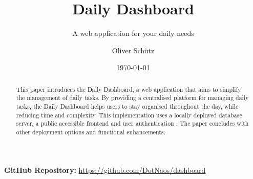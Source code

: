 

\titlehead{BSc Computational and Data Science\\Course: Computer Science (cds-205)\\Instructor: Ana Petrus\hfill}
\title{Daily Dashboard}
\subtitle{A web application for your daily needs}
\author[1,*]{Oliver Schütz}
\date{\today}
\maketitle

\begin{abstract}
    This paper intruduces the Daily Dashboard, a web application that aims to simplify the management of daily tasks.
    By providing a centralised platform for managing daily tasks, the Daily Dashboard helps users to stay organised throughout the day, while reducing time and complexity.
    This implementation uses a locally deployed database server, a public accessible frontend and user authentication . The paper concludes with other deployment options and functional enhancements.
\end{abstract}

\vfill
\begin{center}
    \textbf{GitHub Repository:} \url{https://github.com/DotNaos/dashboard}
\end{center}
\vfill
